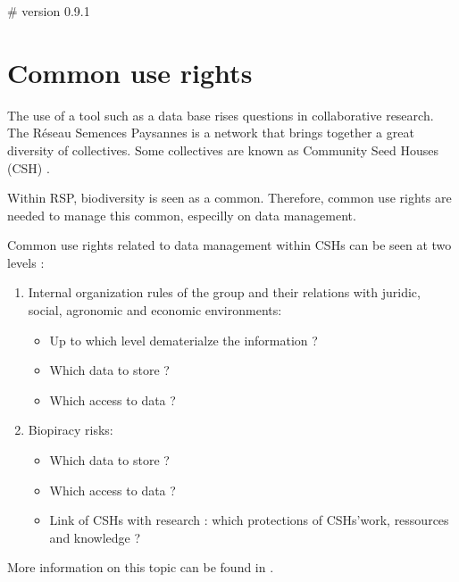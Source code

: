 # version 0.9.1
\section{Common use rights}

The use of a tool such as a data base rises questions in collaborative research.
The R\'eseau Semences Paysannes is a network that brings together a great diversity of collectives.
Some collectives are known as Community Seed Houses (CSH) \citep{rsp_msp_2014}.

Within RSP, biodiversity is seen as a common.
Therefore, common use rights are needed to manage this common, especilly on data management.

Common use rights related to data management within CSHs can be seen at two levels :

\begin{enumerate}

\item Internal organization rules of the group and their relations with juridic, social, agronomic and economic environments:
	\begin{itemize}
	\item Up to which level dematerialze the information ?
	\item Which data to store ?
	\item Which access to data ?
	\end{itemize}

\item Biopiracy risks:
	\begin{itemize}
	\item Which data to store ?
	\item Which access to data ?
	\item Link of CSHs with research : which protections of CSHs'work, ressources and knowledge ?
	\end{itemize}

\end{enumerate}

More information on this topic can be found in \citet{rsp_element_2015}.



